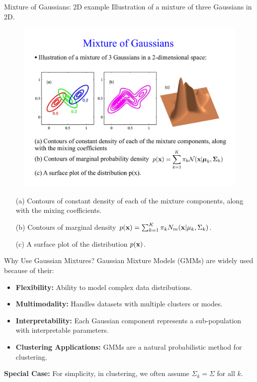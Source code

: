 \documentclass[11pt,handout,aspectratio=169]{beamer}
\begin{document}
\begin{frame}{Mixture of Gaussians: 2D example}
Illustration of a mixture of three Gaussians in 2D.
\begin{figure}
\includegraphics[width=4.8in]{pics/raw1.pdf}
\end{figure}
\vspace{-5mm}
\begin{itemize}
	\item [(a)] Contours of constant density of each of the mixture components, along with the mixing coefficients. 
	\item [(b)] Contours of marginal density $p(\mathbf{x})=\sum_{k=1}^K \pi_k N_m(\mathbf{x}|\mu_k,\Sigma_k)$.
	\item [(c)] A surface plot of the distribution $p(\mathbf{x})$.
\end{itemize}
\end{frame}

\begin{frame}{Why Use Gaussian Mixtures?}
Gaussian Mixture Models (GMMs) are widely used because of their:
\begin{itemize}
    \item \textbf{Flexibility:} Ability to model complex data distributions.
    \item \textbf{Multimodality:} Handles datasets with multiple clusters or modes.
    \item \textbf{Interpretability:} Each Gaussian component represents a sub-population with interpretable parameters.
    \item \textbf{Clustering Applications:} GMMs are a natural probabilistic method for clustering.
\end{itemize}

\textbf{Special Case:}
For simplicity, in clustering, we often assume \( \Sigma_k = \Sigma \) for all \( k \).
\end{frame}
\end{document}
